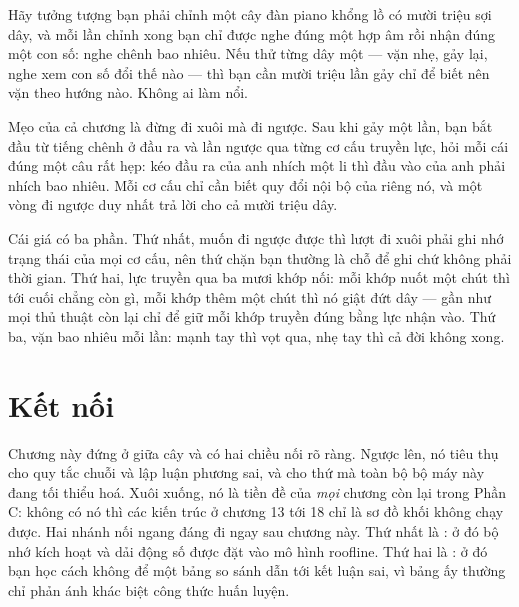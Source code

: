 \documentclass[../../deep_learning.tex]{subfiles}
\begin{document}
\begin{dongian}
Hãy tưởng tượng bạn phải chỉnh một cây đàn piano khổng lồ có mười triệu sợi dây, và mỗi lần chỉnh xong bạn chỉ được nghe đúng một hợp âm rồi nhận đúng một con số: nghe chênh bao nhiêu. Nếu thử từng dây một --- vặn nhẹ, gảy lại, nghe xem con số đổi thế nào --- thì bạn cần mười triệu lần gảy chỉ để biết nên vặn theo hướng nào. Không ai làm nổi.

Mẹo của cả chương là đừng đi xuôi mà đi ngược. Sau khi gảy một lần, bạn bắt đầu từ tiếng chênh ở đầu ra và lần ngược qua từng cơ cấu truyền lực, hỏi mỗi cái đúng một câu rất hẹp: kéo đầu ra của anh nhích một li thì đầu vào của anh phải nhích bao nhiêu. Mỗi cơ cấu chỉ cần biết quy đổi nội bộ của riêng nó, và một vòng đi ngược duy nhất trả lời cho cả mười triệu dây.

Cái giá có ba phần. Thứ nhất, muốn đi ngược được thì lượt đi xuôi phải ghi nhớ trạng thái của mọi cơ cấu, nên thứ chặn bạn thường là chỗ để ghi chứ không phải thời gian. Thứ hai, lực truyền qua ba mươi khớp nối: mỗi khớp nuốt một chút thì tới cuối chẳng còn gì, mỗi khớp thêm một chút thì nó giật đứt dây --- gần như mọi thủ thuật còn lại chỉ để giữ mỗi khớp truyền đúng bằng lực nhận vào. Thứ ba, vặn bao nhiêu mỗi lần: mạnh tay thì vọt qua, nhẹ tay thì cả đời không xong.

\end{dongian}

\section{Kết nối}
Chương này đứng ở giữa cây và có hai chiều nối rõ ràng. Ngược lên, nó tiêu thụ  cho quy tắc chuỗi và lập luận phương sai, và  cho thứ mà toàn bộ bộ máy này đang tối thiểu hoá. Xuôi xuống, nó là tiền đề của \emph{mọi} chương còn lại trong Phần C: không có nó thì các kiến trúc ở chương 13 tới 18 chỉ là sơ đồ khối không chạy được. Hai nhánh nối ngang đáng đi ngay sau chương này. Thứ nhất là : ở đó bộ nhớ kích hoạt và dải động số được đặt vào mô hình roofline. Thứ hai là : ở đó bạn học cách không để một bảng so sánh dẫn tới kết luận sai, vì bảng ấy thường chỉ phản ánh khác biệt công thức huấn luyện.
\end{document}
